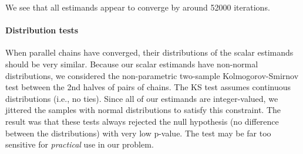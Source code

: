 We see that all estimands appear to converge by around 52000
iterations.

\paragraph{Distribution tests}

When parallel chains have converged, their distributions of the scalar
estimands should be very similar. Because our scalar estimands have
non-normal distributions, we considered the non-parametric two-sample
Kolmogorov-Smirnov test between the 2nd halves of pairs of chains. The
KS test assumes continuous distributions (i.e., no ties). Since all of our
estimands are integer-valued, we jittered the samples with normal
distributions to satisfy this
constraint. 
The result was that these tests always rejected the null hypothesis
(no difference between the distributions) with very low p-value. The
test may be far too sensitive for \emph{practical} use in our problem.

